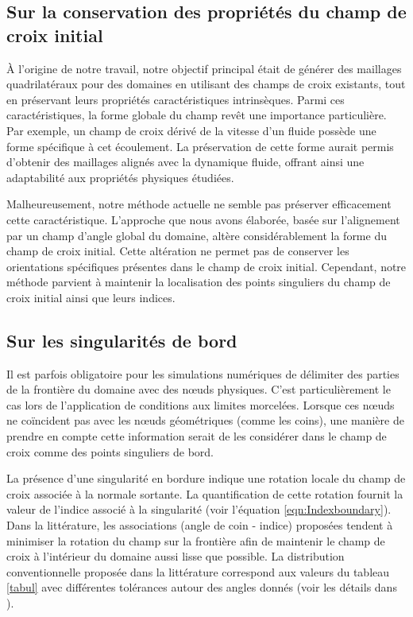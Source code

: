 \subsection{Sur la conservation des propriétés du champ de croix initial}

À l'origine de notre travail, notre objectif principal était de générer des maillages quadrilatéraux pour des domaines en utilisant des champs de croix existants, tout en préservant leurs propriétés caractéristiques intrinsèques. Parmi ces caractéristiques, la forme globale du champ revêt une importance particulière. Par exemple, un champ de croix dérivé de la vitesse d'un fluide possède une forme spécifique à cet écoulement. La préservation de cette forme aurait permis d'obtenir des maillages alignés avec la dynamique fluide, offrant ainsi une adaptabilité aux propriétés physiques étudiées.

Malheureusement, notre méthode actuelle ne semble pas préserver efficacement cette caractéristique. L'approche que nous avons élaborée, basée sur l'alignement par un champ d'angle global du domaine, altère considérablement la forme du champ de croix initial. Cette altération ne permet pas de conserver les orientations spécifiques présentes dans le champ de croix initial. Cependant, notre méthode parvient à maintenir la localisation des points singuliers du champ de croix initial ainsi que leurs indices.

\subsection{Sur les singularités de bord}

Il est parfois obligatoire pour les simulations numériques de délimiter des parties de la frontière du domaine avec des nœuds physiques. C'est particulièrement le cas lors de l'application de conditions aux limites morcelées. Lorsque ces nœuds ne coïncident pas avec les nœuds géométriques (comme les coins), une manière de prendre en compte cette information serait de les considérer dans le champ de croix comme des points singuliers de bord.

La présence d'une singularité en bordure indique une rotation locale du champ de croix associée à la normale sortante. La quantification de cette rotation fournit la valeur de l'indice associé à la singularité (voir l'équation \eqref{eqn:Indexboundary}). Dans la littérature, les associations (angle de coin - indice) proposées tendent à minimiser la rotation du champ sur la frontière afin de maintenir le champ de croix à l'intérieur du domaine aussi lisse que possible. La distribution conventionnelle proposée dans la littérature correspond aux valeurs du tableau \ref{tabul} avec différentes tolérances autour des angles donnés (voir les détails dans \cite{macq2020ginzburg}).

